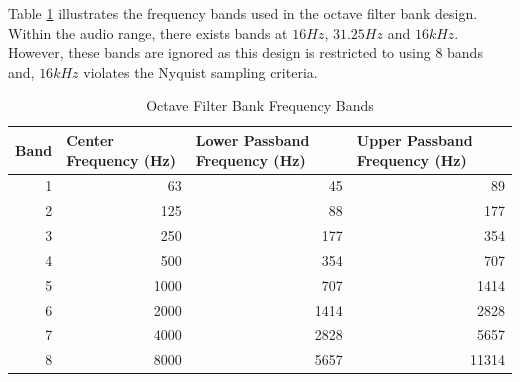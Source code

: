 \documentclass[12pt, onecolumn]{article}
\begin{document}
\begin{appendices}
\noindent Table \ref{tab:octFreqBands} illustrates the frequency bands used in the octave filter bank design. Within the audio range, there exists bands at $16Hz$, $31.25Hz$ and $16kHz$. However, these bands are ignored as this design is restricted to using $8$ bands and, $16kHz$ violates the Nyquist sampling criteria.

\begin{table}[htbp]
  \centering
  \caption{Octave Filter Bank Frequency Bands}
  \begin{adjustbox}{width=\linewidth}
    \begin{tabular}{|r|r|r|r|}
    \hline
    \multicolumn{1}{|l|}{\textbf{Band}} & \multicolumn{1}{l|}{\textbf{Center Frequency (Hz)}} & \multicolumn{1}{l|}{\textbf{Lower Passband Frequency (Hz)}} & \multicolumn{1}{l|}{\textbf{Upper Passband Frequency (Hz)}} \\
    \hline
    1     & 63    & 45    & 89 \\
    \hline
    2     & 125   & 88    & 177 \\
    \hline
    3     & 250   & 177   & 354 \\
    \hline
    4     & 500   & 354   & 707 \\
    \hline
    5     & 1000  & 707   & 1414 \\
    \hline
    6     & 2000  & 1414  & 2828 \\
    \hline
    7     & 4000  & 2828  & 5657 \\
    \hline
    8     & 8000  & 5657  & 11314 \\
    \hline
    \end{tabular}%
    \end{adjustbox}
  \label{tab:octFreqBands}%
\end{table}%


\end{appendices}
\end{document}
